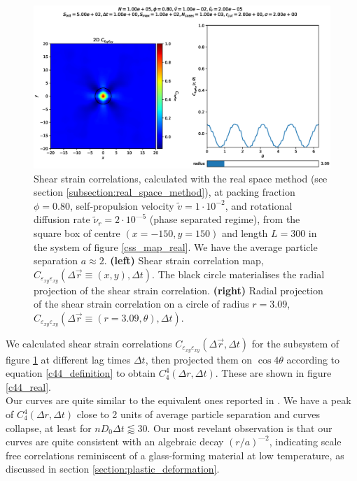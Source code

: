 \documentclass[class=report, float=false, crop=false]{standalone}
\begin{document}
\begin{figure}[H]
\centering
\includegraphics[width=\textwidth]{figures/figs/Cssb_Dk8000_Vj1000_Rg2000_Nq1000_In5000_Tl1000_Ml1000_Co1000_Bn3000_XN1500_Yn1500_grid_circle.eps}
\caption{Shear strain correlations, calculated with the real space method (see section \ref{subsection:real_space_method}), at packing fraction $\phi = 0.80$, self-propulsion velocity $\tilde{v} = 1\cdot10^{-2}$, and rotational diffusion rate $\tilde{\nu}_r = 2\cdot10^{—5}$ (phase separated regime), from the square box of centre $(x=-150, y=150)$ and length $L=300$ in the system of figure \ref{css_map_real}. We have the average particle separation $a \approx 2$. \textbf{(left)} Shear strain correlation map, $C_{\varepsilon_{xy}\varepsilon_{xy}}(\Delta\vec{r} \equiv (x, y), \Delta t)$. The black circle materialises the radial projection of the shear strain correlation. \textbf{(right)} Radial projection of the shear strain correlation on a circle of radius $r=3.09$, $C_{\varepsilon_{xy}\varepsilon_{xy}}(\Delta\vec{r} \equiv (r=3.09, \theta), \Delta t)$.}
\label{css_map_real_quarter}
\end{figure}

We calculated shear strain correlations $C_{\varepsilon_{xy}\varepsilon_{xy}}(\Delta \vec{r}, \Delta t)$ for the subsystem of figure \ref{css_map_real_quarter} at different lag times $\Delta t$, then projected them on $\cos4\theta$ according to equation \ref{c44_definition} to obtain $C_4^4(\Delta r, \Delta t)$. These are shown in figure \ref{c44_real}.\\

Our curves are quite similar to the equivalent ones reported in \cite{illing2016strain, hassani2018long}. We have a peak of $C_4^4(\Delta r, \Delta t)$ close to 2 units of average particle separation and curves collapse, at least for $nD_0\Delta t \lessapprox 30$. Our most revelant observation is that our curves are quite consistent with an algebraic decay $(r/a)^{—2}$, indicating scale free correlations reminiscent of a glass-forming material at low temperature, as discussed in section \ref{section:plastic_deformation}.\\
\end{document}

